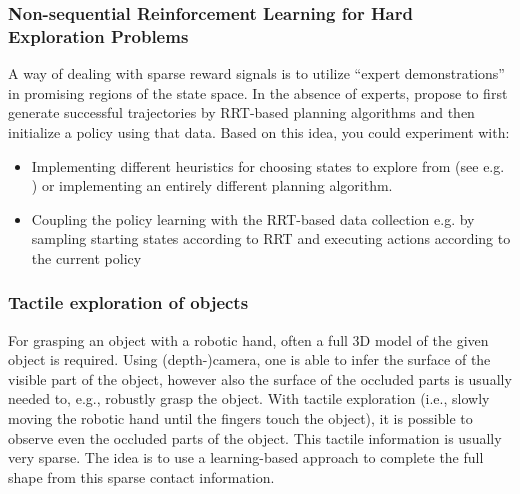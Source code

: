 \documentclass[a4paper]{article}
\begin{document}

\subsubsection{Non-sequential Reinforcement Learning for Hard Exploration Problems}
A way of dealing with sparse reward signals is to utilize ``expert demonstrations'' in promising regions of the state space. In the absence of experts, \citet{blau2021learning} propose to first generate successful trajectories by RRT-based planning algorithms and then initialize a policy using that data. Based on this idea, you could experiment with:
\begin{itemize}
  \item Implementing different heuristics for choosing states to explore from (see e.g. \citet{ecoffet2019go}) or implementing an entirely different planning algorithm.
  \item Coupling the policy learning with the RRT-based data collection e.g. by sampling starting states according to RRT and executing actions according to the current policy
\end{itemize}

\subsubsection{Tactile exploration of objects}
For grasping an object with a robotic hand, often a full 3D model of the given object is required.
Using (depth-)camera, one is able to infer the surface of the visible part of the object, however also the surface of the occluded parts is usually needed to, e.g., robustly grasp the object.
With tactile exploration (i.e., slowly moving the robotic hand until the fingers touch the object), it is possible to observe even the occluded parts of the object.
This tactile information is usually very sparse. The idea is to use a learning-based approach to complete the full shape from this sparse contact information.
\end{document}
